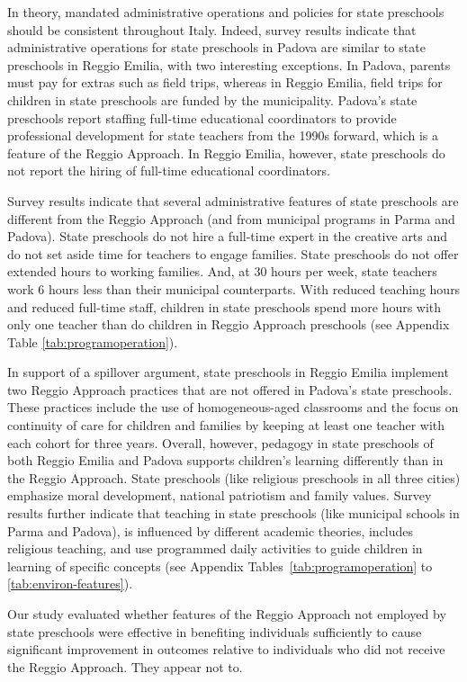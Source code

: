 In theory, mandated administrative operations and policies for state preschools should be consistent throughout Italy. Indeed, survey results indicate that administrative operations for state preschools in Padova are similar to state preschools in Reggio Emilia, with two interesting exceptions. In Padova, parents must pay for extras such as field trips, whereas in Reggio Emilia, field trips for children in state preschools are funded by the municipality. Padova's state preschools report staffing full-time educational coordinators to provide professional development for state teachers from the 1990s forward, which is a feature of the Reggio Approach. In Reggio Emilia, however, state preschools do not report the hiring of full-time educational coordinators. 

Survey results indicate that several administrative features of state preschools are different from the Reggio Approach (and from municipal programs in Parma and Padova). State preschools do not hire a full-time expert in the creative arts and do not set aside time for teachers to engage families. State preschools do not offer extended hours to working families. And, at 30 hours per week, state teachers work 6 hours less than their municipal counterparts. With reduced teaching hours and reduced full-time staff, children in state preschools spend more hours with only one teacher than do children in Reggio Approach preschools (see Appendix Table \ref{tab:programoperation}). 

In support of a spillover argument, state preschools in Reggio Emilia implement two Reggio Approach practices that are not offered in Padova's state preschools. These practices include the use of homogeneous-aged classrooms and the focus on continuity of care for children and families by keeping at least one teacher with each cohort for three years. Overall, however, pedagogy in state preschools of both Reggio Emilia and Padova  supports children's learning differently than in the Reggio Approach. State preschools (like religious preschools in all three cities) emphasize moral development, national patriotism and family values. Survey results further indicate that teaching in state preschools (like municipal schools in Parma and Padova), is influenced by different academic theories, includes religious teaching, and use programmed daily activities to guide children in learning of specific concepts (see Appendix Tables~\ref{tab:programoperation} to \ref{tab:environ-features}). 

Our study evaluated whether features of the Reggio Approach not employed by state preschools were effective in benefiting individuals sufficiently to cause significant improvement in outcomes relative to individuals who did not receive the Reggio Approach. They appear not to.

